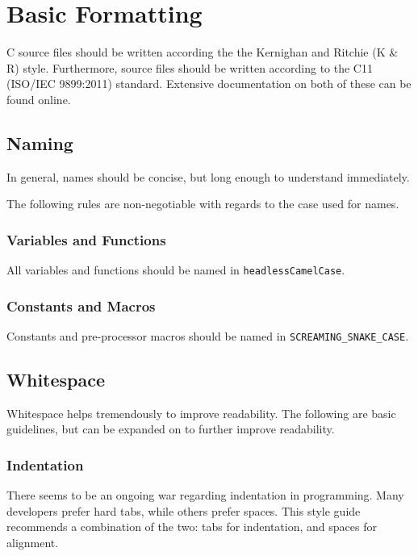 \documentclass[StyleGuide.tex]{subfiles}
\begin{document}
\chapter{Basic Formatting}\label{basic-formatting}

C source files should be written according the the Kernighan and Ritchie
(K \& R) style. Furthermore, source files should be written according to
the C11 (ISO/IEC 9899:2011) standard. Extensive documentation on both of
these can be found online.

\section{Naming}\label{naming}

In general, names should be concise, but long enough to understand
immediately.

The following rules are non-negotiable with regards to the case used for
names.

\subsection{Variables and Functions}\label{variables-and-functions}

All variables and functions should be named in
\texttt{headlessCamelCase}.

\subsection{Constants and Macros}\label{constants-and-macros}

Constants and pre-processor macros should be named in
\texttt{SCREAMING\_SNAKE\_CASE}.

\section{Whitespace}\label{whitespace}

Whitespace helps tremendously to improve readability. The following are
basic guidelines, but can be expanded on to further improve readability.

\subsection{Indentation}\label{indentation}


There seems to be an ongoing war regarding indentation in programming. Many
developers prefer hard tabs, while others prefer spaces. This style guide
recommends a combination of the two: tabs for indentation, and spaces for
alignment.
\end{document}
